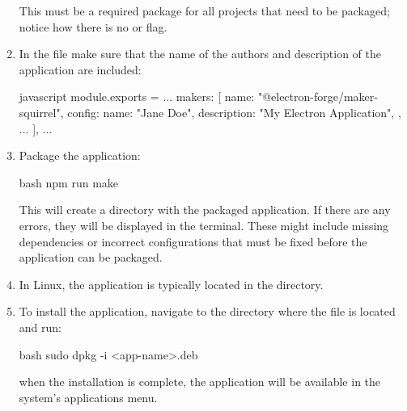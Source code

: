 \begin{enumerate}
    This must be a required package for all projects that need to be packaged; notice how there
    is no  or  flag.
    \item In the  file make sure that the name of the authors
    and description of the application are included:
    \begin{mintedbox}{javascript}
module.exports = {
    ...
    makers: [
        {
            name: "@electron-forge/maker-squirrel",
            config: {
                name: "Jane Doe",
                description: "My Electron Application",
            }
        },
        ...
    ],
    ...
}
    \end{mintedbox}
    \item Package the application:
    \begin{mintedbox}{bash}
npm run make
    \end{mintedbox}
    This will create a  directory with the packaged application. If there are
    any errors, they will be displayed in the terminal. These might include missing dependencies or
    incorrect configurations that must be fixed before the application can be packaged.
    \item In Linux, the application is typically located in the
     directory.
    \item To install the application, navigate to the directory where the  file
    is located and run:
    \begin{mintedbox}{bash}
sudo dpkg -i <app-name>.deb
    \end{mintedbox}
    when the installation is complete, the application will be available in the system's
    applications menu.
\end{enumerate}
